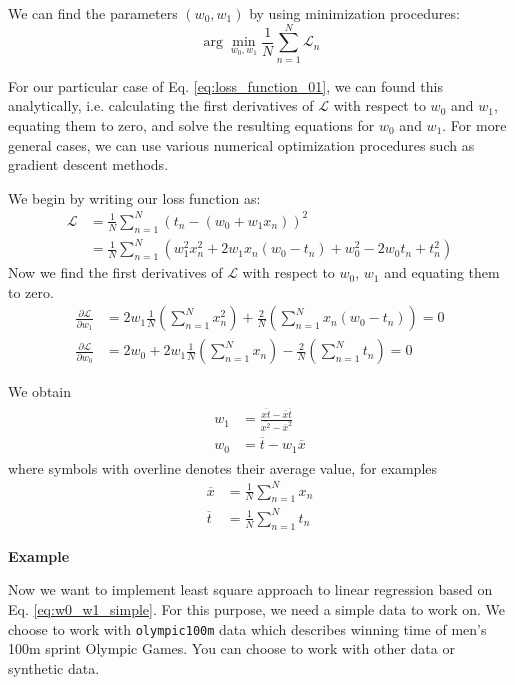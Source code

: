 \documentclass[b5paper,12pt]{article} %
\newcommand{\txtinline}[1]{\texttt{#1}}
\begin{document}
We can find the parameters $(w_{0},w_{1})$ by using minimization procedures:
\begin{equation}
\arg\min_{w_{0},w_{1}} \frac{1}{N} \sum_{n=1}^{N} \mathcal{L}_{n}
\end{equation}

For our particular case of Eq. \eqref{eq:loss_function_01}, we can found this analytically,
i.e. calculating the first derivatives of $\mathcal{L}$ with
respect to $w_0$ and $w_1$, equating
them to zero, and solve the resulting equations for $w_0$ and $w_1$.
For more general cases, we can use various numerical optimization procedures such as
gradient descent methods.

We begin by writing our loss function as:
\begin{align*}
\mathcal{L} & = \frac{1}{N} \sum_{n=1}^{N} \left( t_n - (w_0 + w_1 x_{n}) \right)^2 \\
& = \frac{1}{N} \sum_{n=1}^{N} \left( w_1^2 x_n^2 + 2w_{1}x_{n}(w_0 - t_n) + w_0^2 - 2w_0 t_n + t_n^2 \right)
\end{align*}
%
Now we find the first derivatives of $\mathcal{L}$ with respect to
$w_0$, $w_1$ and equating them to zero.
\begin{align*}
\frac{\partial\mathcal{L}}{\partial w_1} & = 2w_1 \frac{1}{N} \left( \sum_{n=1}^{N} x_n^2 \right) +
\frac{2}{N} \left( \sum_{n=1}^{N} x_{n} (w_0 - t_n) \right) = 0 \\
\frac{\partial \mathcal{L}}{\partial w_0} & = 2w_0 + 2w_1 \frac{1}{N} \left( \sum_{n=1}^{N} x_n \right) -
\frac{2}{N} \left( \sum_{n=1}^{N} t_n \right) = 0
\end{align*}

We obtain
\begin{align}
\begin{split}
w_{1} & = \frac{\overline{xt} - \overline{x}\overline{t}}{\overline{x^2} - \overline{x}^2} \\
w_{0} & = \overline{t} - w_{1} \overline{x}
\end{split}
\label{eq:w0_w1_simple}
\end{align}
where symbols with overline denotes their average value, for examples
\begin{align*}
\overline{x} & = \frac{1}{N} \sum_{n=1}^{N} x_{n} \\
\overline{t} & = \frac{1}{N} \sum_{n=1}^{N} t_{n}
\end{align*}

\textbf{Example}

Now we want to implement least square approach to linear regression based on
Eq. \ref{eq:w0_w1_simple}. For this purpose, we need a simple data to work on.
We choose to work with \txtinline{olympic100m} data which describes 
winning time of men's 100m sprint Olympic Games. You can choose to work with other
data or synthetic data.
\end{document}
